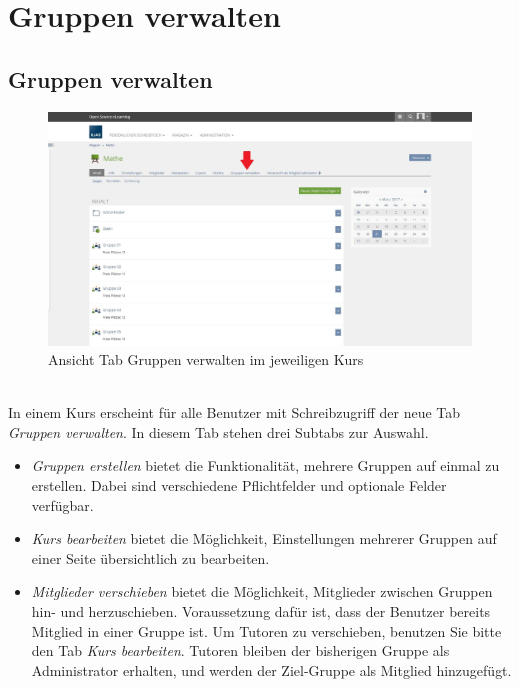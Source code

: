 \chapter{Gruppen verwalten}\label{gruppenVerwalten}
\minitoc
\clearpage


\section{Gruppen verwalten}
\begin{figure}[ht]
	\centering
	\includegraphics[width=1\textwidth]{img/gruppenverwalten.jpg}
	\caption{Ansicht Tab Gruppen verwalten im jeweiligen Kurs}
\end{figure}

~\\ In einem Kurs erscheint für alle Benutzer mit Schreibzugriff der neue Tab \textit{Gruppen verwalten}. In diesem Tab stehen drei Subtabs zur Auswahl. 
\begin{itemize}
	\item \textit{Gruppen erstellen} bietet die Funktionalität, mehrere Gruppen auf einmal zu erstellen. Dabei sind verschiedene Pflichtfelder und optionale Felder verfügbar.
	\item \textit{Kurs bearbeiten} bietet die Möglichkeit, Einstellungen mehrerer Gruppen auf einer Seite übersichtlich zu bearbeiten.
	\item \textit{Mitglieder verschieben} bietet die Möglichkeit, Mitglieder zwischen Gruppen hin- und herzuschieben. Voraussetzung dafür ist, dass der Benutzer bereits Mitglied in einer Gruppe ist. Um Tutoren zu verschieben, benutzen Sie bitte den Tab \textit{Kurs bearbeiten}. Tutoren bleiben der bisherigen Gruppe als Administrator erhalten, und werden der Ziel-Gruppe als Mitglied hinzugefügt.
\end{itemize} 
\clearpage


